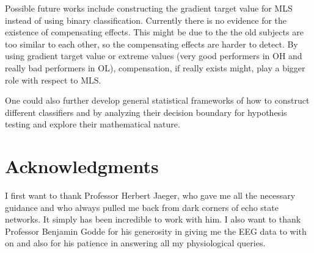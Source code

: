 \documentclass[a4paper,11pt,oneside]{article}
\begin{document}
Possible future works include constructing the gradient target value for MLS instead of using binary classification. Currently there is no evidence for the existence of compensating effects. This might be due to the the old subjects are too similar to each other, so the compensating effects are harder to detect. By using gradient target value or extreme values (very good performers in OH and really bad performers in OL), compensation, if really exists might, play a bigger role with respect to MLS. 

One could also further develop general statistical frameworks of how to construct different classifiers and by analyzing their decision boundary for hypothesis testing and explore their mathematical nature.

\section{Acknowledgments}
I first want to thank Professor Herbert Jaeger, who gave me all the necessary guidance and who always pulled me back from dark corners of echo state networks. It simply has been incredible to work with him. I also want to thank Professor Benjamin Godde for his generosity in giving me the EEG data to with on and also for his patience in answering all my physiological queries.


\clearpage
\newpage





\end{document}
